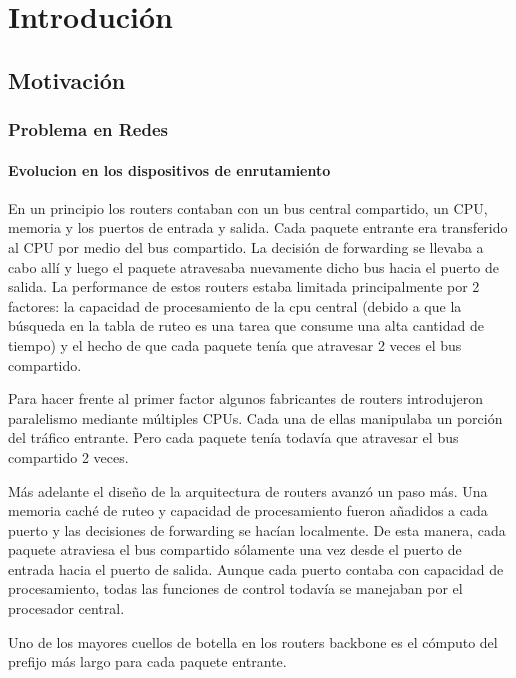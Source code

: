 \chapter{Introdución}

\section{Motivación}

\subsection{Problema en Redes}
\subsubsection{Evolucion en los dispositivos de enrutamiento}

En un principio los routers contaban con un bus central compartido, un CPU, memoria y los puertos de entrada y salida. Cada paquete entrante era transferido al CPU por medio del bus compartido. La decisión de forwarding se llevaba a cabo allí y luego el paquete atravesaba nuevamente dicho bus hacia el puerto de salida. La performance de estos routers estaba limitada principalmente por 2 factores: la capacidad de procesamiento de la cpu central (debido a que la búsqueda en la tabla de ruteo es una tarea que consume una alta cantidad de tiempo) y el hecho de que cada paquete tenía que atravesar 2 veces el bus compartido.

Para hacer frente al primer factor algunos fabricantes de routers introdujeron paralelismo mediante múltiples CPUs. Cada una de ellas manipulaba un porción del tráfico entrante. Pero cada paquete tenía todavía que atravesar el bus compartido 2 veces. 

Más adelante el diseño de la arquitectura de routers avanzó un paso más. Una memoria caché de ruteo y capacidad de procesamiento fueron añadidos a cada puerto y las decisiones de forwarding se hacían localmente. De esta manera, cada paquete atraviesa el bus compartido sólamente una vez desde el puerto de entrada hacia el puerto de salida. Aunque cada puerto contaba con capacidad de procesamiento, todas las funciones de control todavía se manejaban por el procesador central.









Uno de los mayores cuellos de botella en los routers backbone es el cómputo del prefijo más largo para cada paquete entrante.


